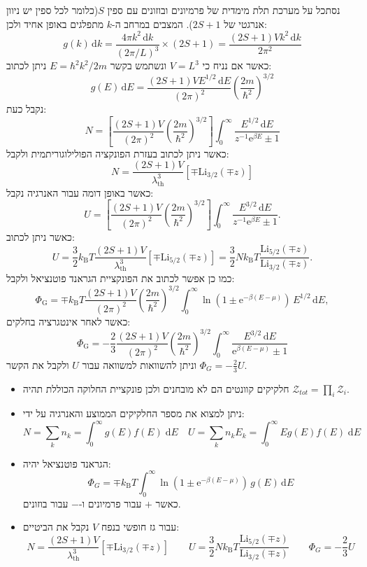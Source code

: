 \documentclass{tstextbook}
\begin{document}
\begin{example}
נסתכל על מערכת תלת מימדית של פרמיונים ובוזונים עם ספין \(S\)(כלומר לכל ספין יש ניוון אנרגטי של \(2S+1\)). המצבים במרחב ה-\(k\) מתפלגים באופן אחיד ולכן:
$$g(k)\,\mathrm{d}k={\frac{4\pi k^{2}\,\mathrm{d}k}{(2\pi/L)^{3}}}\times(2S+1)={\frac{(2S+1)V k^{2}\,\mathrm{d}k}{2\pi^{2}}}$$
כאשר אם נניח כי \(V=L^{3}\) ונשתמש בקשר \(E=\hbar^{2}k^{2} / 2m\) ניתן לכתוב:
$$g(E)\,\mathrm{d}E={\frac{(2S+1)V E^{1/2}\,\mathrm{d}E}{(2\pi)^{2}}}\left({\frac{2m}{\hbar^{2}}}\right)^{3/2}$$
נקבל כעת:
$$N=\left[\frac{(2S+1)V}{(2\pi)^{2}}\left(\frac{2m}{\hbar^{2}}\right)^{3/2}\right]\int_{0}^{\infty}\frac{E^{1/2}\,\mathrm{d}E}{z^{-1}\mathrm{e}^{\beta E}\pm1}$$
כאשר ניתן לכתוב בעזרת הפונקציה הפולילוגוריתמית ולקבל:
$$N=\frac{(2S+1)V}{\lambda_{\mathrm{th}}^{3}}[\mp\mathrm{Li}_{3/2}(\mp z)]$$
כאשר באופן דומה עבור האנרגיה נקבל:
$$U=\left[\frac{(2S+1)V}{(2\pi)^{2}}\left(\frac{2m}{\hbar^{2}}\right)^{3/2}\right]\int_{0}^{\infty}\frac{E^{3/2}\,\mathrm{d}E}{z^{-1}\mathrm{e}^{\beta E}\pm1}.$$
כאשר ניתן לכתוב:
$$U={{\frac{3}{2}k_{\mathrm{B}}T\frac{(2S+1)V}{\lambda_{\mathrm{th}}^{3}}[\mp\mathrm{Li}_{5/2}(\mp z)]}}=\frac{3}{2}N k_{\mathrm{B}}T\frac{\mathrm{Li}_{5/2}(\mp z)}{\mathrm{Li}_{3/2}(\mp z)}.$$
כמו כן אפשר לכתוב את הפונקציית הגראנד פוטנציאל ולקבל:
$$\Phi_{\mathrm{G}}=\mp k_{\mathrm{B}}T{\frac{(2S+1)V}{(2\pi)^{2}}}\left({\frac{2m}{\hbar^{2}}}\right)^{3/2}\int_{0}^{\infty}\ln(1\pm\mathrm{e}^{-\beta(E-\mu)})\,E^{1/2}\,\mathrm{d}E,$$
כאשר לאחר אינטגרציה בחלקים:
$$\Phi_{\mathrm{G}}=-\frac{2}{3}\frac{(2S+1)V}{(2\pi)^{2}}\left(\frac{2m}{\hbar^{2}}\right)^{3/2}\int_{0}^{\infty}\frac{E^{3/2}\,\mathrm{d}E}{\mathrm{e}^{\beta(E-\mu)}\pm1}$$
וניתן להשוואות למשוואה עבור \(U\) ולקבל את הקשר \(\Phi_{G}=-\frac{2}{3}U\).

\end{example}
\begin{summary}
  \begin{itemize}
    \item חלקיקים קוונטים הם לא מובחנים ולכן פונקציית החלוקה הכוללת תהיה \({\mathcal{Z}}_{t o t}=\prod_{i}{\mathcal{Z}}_{i}\).
    \item ניתן למצוא את מספר החלקיקים הממוצע והאנרגיה על ידי:
$$N\!=\!\sum_{k}n_{k}\!=\!\int_{0}^{\infty}\!\!\!{g(E)f(E)\;\mathrm{d}E}\quad U\!=\!\sum_{k}n_{k}E_{k}\!=\!\!\int_{0}^{\infty}\!\!Eg(E)f(E)\;\mathrm{d}E$$
    \item הגראנד פוטנציאל יהיה:
$$\Phi_{G}= \mp k_{\mathrm{B}}T\int_{0}^{\infty}\ln\left( 1\pm\mathrm{e}^{-\beta\left( E-\mu \right)} \right)\,g(E)\,\mathrm{d}E $$
כאשר \(+\) עבור פרמיונים ו-\(-\) עבור בוזונים.
    \item עבור גז חופשי בנפח \(V\) נקבל את הביטיים:
$$N=\frac{(2S+1)V}{\lambda_{\mathrm{th}}^{3}}\left[ \mp\mathrm{Li}_{3/2}\left( \mp z \right) \right] \qquad U=\frac{3}{2}N k_{\mathrm{B}}T\frac{\mathrm{Li}_{5/2}\left( \mp z \right)}{\mathrm{Li}_{3/2}\left( \mp z \right)}\qquad \Phi_{G}=-\frac{2}{3}U$$
  \end{itemize}
\end{summary}
\end{document}
